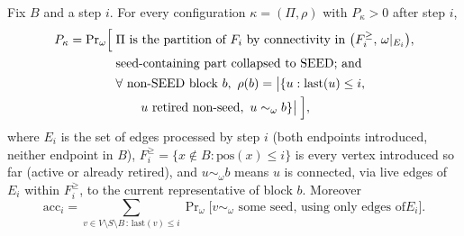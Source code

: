 \documentclass[ijoc,sglanonrev]{informs4}
\begin{document}
\begin{repeatlemma}\label{ec:lem:invariant}
Fix $B$ and a step $i$. For every configuration $\kappa=(\Pi,\rho)$ with
$P_\kappa>0$ after step $i$,
\begin{align*}
P_\kappa=\Pr\nolimits_\omega\Bigl[\;&\Pi\text{ is the partition of }F_i\text{
by connectivity in }\bigl(F_i^{\ge},\,\omega|_{E_i}\bigr),\\
&\text{seed-containing part collapsed to SEED; and}\\
&\forall\text{ non-SEED block }b,\ \rho(b)=\bigl|
\{u:\mathrm{last}(u)\le i,\\
&\qquad u\text{ retired non-seed},\ u\sim_\omega b\}
\bigr|\;\Bigr],
\end{align*}
where $E_i$ is the set of edges processed by step $i$ (both endpoints
introduced, neither endpoint in $B$), $F_i^{\ge}=\{x\notin B:\mathrm{pos}(x)
\le i\}$ is every vertex introduced so far (active or already retired), and
$u\sim_\omega b$ means $u$ is connected, via live edges of $E_i$ within
$F_i^{\ge}$, to the current representative of block $b$. Moreover
$$\mathrm{acc}_i=\sum_{v\in V\setminus S\setminus B\,:\,\mathrm{last}(v)\le
i}\Pr\nolimits_\omega\bigl[v\sim_\omega\text{ some seed, using only edges of
}E_i\bigr].$$
\end{repeatlemma}
\end{document}
